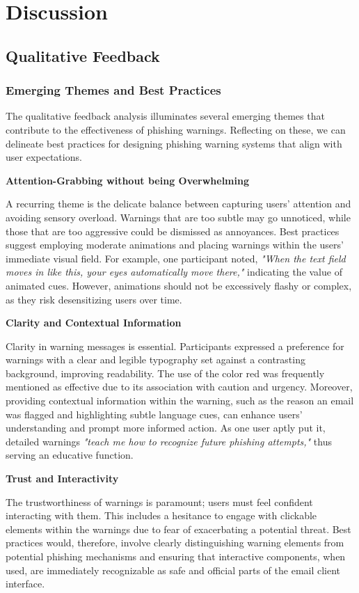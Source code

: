 \documentclass[
  a4paper,  %
  twoside,  %
  bibliography=totoc,
  headsepline,
  cleardoublepage=empty,
  parskip=half,
  draft=false
]{scrbook}
\begin{document}
\chapter{Discussion}
\section{Qualitative Feedback}
\subsection{Emerging Themes and Best Practices}
The qualitative feedback analysis illuminates several emerging themes that contribute to the effectiveness of phishing warnings. Reflecting on these, we can delineate best practices for designing phishing warning systems that align with user expectations.

\textbf{Attention-Grabbing without being Overwhelming}

A recurring theme is the delicate balance between capturing users’ attention and avoiding sensory overload. Warnings that are too subtle may go unnoticed, while those that are too aggressive could be dismissed as annoyances. Best practices suggest employing moderate animations and placing warnings within the users' immediate visual field. For example, one participant noted, \textit{"When the text field moves in like this, your eyes automatically move there,"} indicating the value of animated cues. However, animations should not be excessively flashy or complex, as they risk desensitizing users over time.

\textbf{Clarity and Contextual Information}

Clarity in warning messages is essential. Participants expressed a preference for warnings with a clear and legible typography set against a contrasting background, improving readability. The use of the color red was frequently mentioned as effective due to its association with caution and urgency. Moreover, providing contextual information within the warning, such as the reason an email was flagged and highlighting subtle language cues, can enhance users’ understanding and prompt more informed action. As one user aptly put it, detailed warnings \textit{"teach me how to recognize future phishing attempts,"} thus serving an educative function.

\textbf{Trust and Interactivity}

The trustworthiness of warnings is paramount; users must feel confident interacting with them. This includes a hesitance to engage with clickable elements within the warnings due to fear of exacerbating a potential threat. Best practices would, therefore, involve clearly distinguishing warning elements from potential phishing mechanisms and ensuring that interactive components, when used, are immediately recognizable as safe and official parts of the email client interface.
\end{document}
